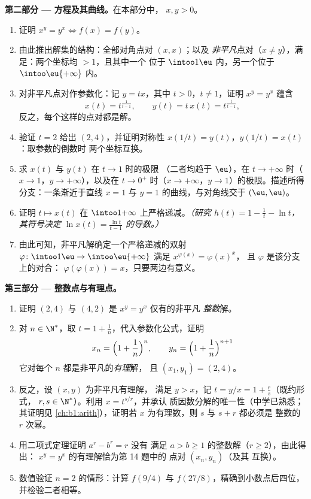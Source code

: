 \begin{problem}
\medskip
\noindent\textbf{第二部分 --- 方程及其曲线。}在本部分中，
$x, y > 0$。
\begin{enumerate}[resume]
  \item 证明 $x^y = y^x \iff f(x) = f(y)$。
  \item 由此推出解集的结构：全部对角点对 $(x, x)$；以及
        \emph{非平凡}点对（$x \neq
        y$），满足：两个坐标均 $> 1$，且其中一个
        位于 $\intoo1\eu$ 内，另一个位于
        $\intoo\eu{+\infty}$ 内。
  \item 对非平凡点对作参数化：记 $y = tx$，其中 $t
        > 0$，$t \neq 1$，证明 $x^y = y^x$ 蕴含
        \[
        x(t) = t^{\frac1{t-1}},
        \qquad
        y(t) = t\,x(t) = t^{\frac{t}{t-1}},
        \]
        反之，每个这样的点对都是解。
  \item 验证 $t = 2$ 给出 $(2, 4)$，并证明对称性
        $x(1/t) = y(t)$，$y(1/t) = x(t)$：取参数的倒数时
        两个坐标互换。
  \item 求 $x(t)$ 与 $y(t)$ 在 $t \to 1$ 时的极限
        （二者均趋于 $\eu$），在 $t \to +\infty$ 时（$x \to 1$，$y
        \to +\infty$），以及在 $t \to 0^+$ 时（$x \to +\infty$，$y \to
        1$）的极限。描述所得分支：一条渐近于直线
        $x = 1$ 与 $y = 1$ 的曲线，与对角线交于
        $(\eu, \eu)$。
  \item 证明 $t \mapsto x(t)$ 在
        $\intoo1{+\infty}$ 上严格递减。\emph{（研究 $h(t) = 1 - \frac1t - \ln
        t$，其符号决定 $\ln x(t) =
        \frac{\ln t}{t - 1}$ 的导数。）}
  \item 由此可知，非平凡解确定一个严格递减的双射
        $\varphi \colon \intoo1\eu \to
        \intoo\eu{+\infty}$ 满足 $x^{\varphi(x)} = \varphi(x)^x$，
        且 $\varphi$ 是该分支上的对合：
        $\varphi(\varphi(x)) = x$，只要两边有意义。
\end{enumerate}

\medskip
\noindent\textbf{第三部分 --- 整数点与有理点。}
\begin{enumerate}[resume]
  \item 证明 $(2, 4)$ 与 $(4, 2)$ 是 $x^y = y^x$ 仅有的非平凡
        \emph{整数}解。
  \item 对 $n \in \N^*$，取 $t = 1 +
        \frac1n$，代入参数化公式，证明
        \[
        x_n = \Bigl(1 + \frac1n\Bigr)^{n},
        \qquad
        y_n = \Bigl(1 + \frac1n\Bigr)^{n+1}
        \]
        它对每个 $n$ 都是非平凡的\emph{有理}解，
        且 $(x_1, y_1) = (2, 4)$。
  \item 反之，设 $(x, y)$ 为非平凡有理解，
        满足 $y > x$，记 $t = y/x = 1 + \frac rs$（既约形式，
        $r, s \in \N^*$）。利用 $x = t^{s/r}$，并承认
        质因数分解的唯一性（中学已熟悉；
        其证明见 \cref{ch:b1:arith}），证明若 $x$
        为有理数，则 $s$ 与 $s + r$ 都必须是
        整数的 $r$ 次幂。
  \item 用二项式定理证明 $a^r - b^r = r$ 没有
        满足 $a > b \geq 1$ 的整数解（$r \geq 2$），由此得出：
        $x^y = y^x$ 的有理解恰为第 14 题中的
        点对 $(x_n, y_n)$（及其
        互换）。
  \item 数值验证 $n = 2$ 的情形：计算 $f(9/4)$ 与
        $f(27/8)$，精确到小数点后四位，并检验二者相等。
\end{enumerate}


\end{problem}
